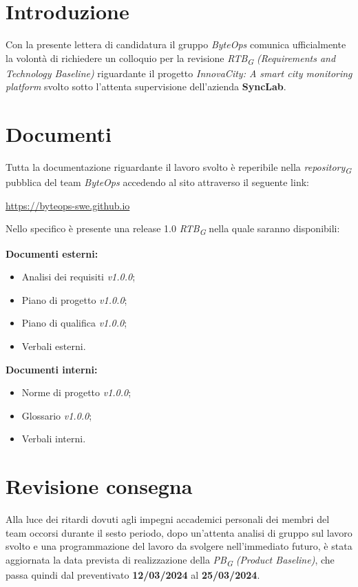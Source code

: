 \documentclass{article}
\begin{document}
\flushleft

\section{Introduzione}
Con la presente lettera di candidatura il gruppo \textit{ByteOps} comunica ufficialmente la volontà di richiedere un colloquio per la revisione \textit{RTB}\textsubscript{\textit{G}} \textit{(Requirements and Technology Baseline)} riguardante il progetto \textit{InnovaCity: A smart city monitoring platform} svolto sotto l'attenta supervisione dell'azienda \textbf{SyncLab}.

\section{Documenti}
Tutta la documentazione riguardante il lavoro svolto è reperibile nella \textit{repository}\textsubscript{\textit{G}} pubblica del team \textit{ByteOps} accedendo al sito attraverso il seguente link:

\begin{center}
    \href{https://byteops-swe.github.io}{https://byteops-swe.github.io}
\end{center}

Nello specifico è presente una release 1.0 \textit{RTB}\textsubscript{\textit{G}} nella quale saranno disponibili:
\vspace{0.2cm}

\textbf{Documenti esterni:}
\begin{itemize}
    \item Analisi dei requisiti \textit{v1.0.0};
    \item Piano di progetto \textit{v1.0.0};
    \item Piano di qualifica \textit{v1.0.0};
    \item Verbali esterni.
\end{itemize}
\vspace{0.2cm}

\textbf{Documenti interni:}
\begin{itemize}
    \item Norme di progetto \textit{v1.0.0};
    \item Glossario \textit{v1.0.0};
    \item Verbali interni.
\end{itemize}

\section{Revisione consegna}
Alla luce dei ritardi dovuti agli impegni accademici personali dei membri del team occorsi durante il sesto periodo, dopo un'attenta analisi di gruppo sul lavoro svolto e una programmazione del lavoro da svolgere nell'immediato futuro, è stata aggiornata la data prevista di realizzazione della \textit{PB}\textsubscript{\textit{G}} \textit{(Product Baseline)}, che passa quindi dal preventivato \textbf{12/03/2024} al \textbf{25/03/2024}.
\end{document}
